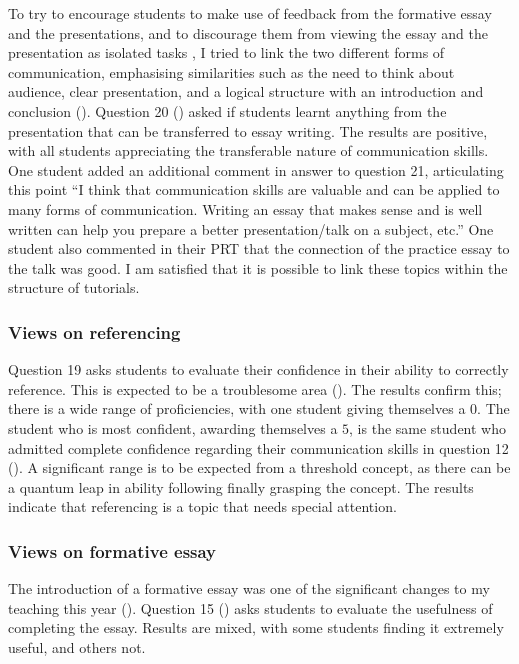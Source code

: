 To try to encourage students to make use of feedback from the formative essay and the presentations, and to discourage them from viewing the essay and the presentation as isolated tasks \citep[cf.][]{Housell2003}, I tried to link the two different forms of communication, emphasising similarities such as the need to think about audience, clear presentation, and a logical structure with an introduction and conclusion (). Question 20 () asked if students learnt anything from the presentation that can be transferred to essay writing. The results are positive, with all students appreciating the transferable nature of communication skills. One student added an additional comment in answer to question 21, articulating this point ``I think that communication skills are valuable and can be applied to many forms of communication. Writing an essay that makes sense and is well written can help you prepare a better presentation/talk on a subject, etc.'' One student also commented in their PRT that the connection of the practice essay to the talk was good. I am satisfied that it is possible to link these topics within the structure of tutorials.

\subsubsection{Views on referencing}\label{sec:referencing}

Question 19 asks students to evaluate their confidence in their ability to correctly reference. This is expected to be a troublesome area (). The results confirm this; there is a wide range of proficiencies, with one student giving themselves a $0$. The student who is most confident, awarding themselves a $5$, is the same student who admitted complete confidence regarding their communication skills in question 12 (). A significant range is to be expected from a threshold concept, as there can be a quantum leap in ability following finally grasping the concept. The results indicate that referencing is a topic that needs special attention.

\subsubsection{Views on formative essay}\label{sec:views-form}

The introduction of a formative essay was one of the significant changes to my teaching this year (). Question 15 () asks students to evaluate the usefulness of completing the essay. Results are mixed, with some students finding it extremely useful, and others not.

